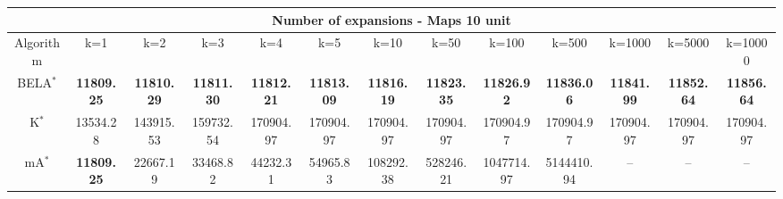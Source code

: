 \begin{tabular}{c|cccccccccccc}\toprule
\multicolumn{13}{c}{Number of expansions - Maps 10 unit}\\ \midrule
Algorithm & k=1 & k=2 & k=3 & k=4 & k=5 & k=10 & k=50 & k=100 & k=500 & k=1000 & k=5000 & k=10000 \\ \midrule
BELA$^*$ & \textbf{11809.25} & \textbf{11810.29} & \textbf{11811.30} & \textbf{11812.21} & \textbf{11813.09} & \textbf{11816.19} & \textbf{11823.35} & \textbf{11826.92} & \textbf{11836.06} & \textbf{11841.99} & \textbf{11852.64} & \textbf{11856.64} \\
K$^*$ & 13534.28 & 143915.53 & 159732.54 & 170904.97 & 170904.97 & 170904.97 & 170904.97 & 170904.97 & 170904.97 & 170904.97 & 170904.97 & 170904.97 \\
mA$^*$ & \textbf{11809.25} & 22667.19 & 33468.82 & 44232.31 & 54965.83 & 108292.38 & 528246.21 & 1047714.97 & 5144410.94 & -- & -- & -- \\ \bottomrule 
\end{tabular}

